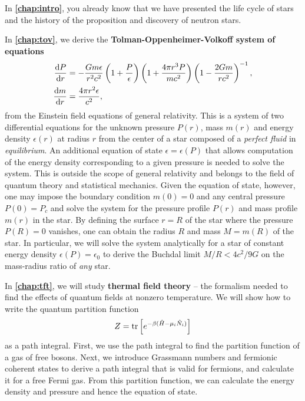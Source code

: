 In \textbf{\cref{chap:intro}}, you already know that we have presented the life cycle of stars and the history of the proposition and discovery of neutron stars.

In \textbf{\cref{chap:tov}}, we derive the \textbf{Tolman-Oppenheimer-Volkoff system of equations}
\begin{align*}
	\odv{P}{r} &= -\frac{G m \epsilon}{r^2 c^2} \left( 1 + \frac{P}{\epsilon} \right) \left( 1 + \frac{4 \pi r^3 P}{m c^2} \right) \left( 1 - \frac{2 G m}{r c^2} \right)^{-1} , \\
	\odv{m}{r} &= \frac{4 \pi r^2 \epsilon}{c^2} ,
\end{align*}
from the Einstein field equations of general relativity.
This is a system of two differential equations for the unknown pressure $P(r)$, mass $m(r)$ and energy density $\epsilon(r)$ at radius $r$ from the center of a star composed of a \emph{perfect fluid} in \emph{equilibrium}.
An additional equation of state $\epsilon = \epsilon(P)$ that allows computation of the energy density corresponding to a given pressure is needed to solve the system.
This is outside the scope of general relativity and belongs to the field of quantum theory and statistical mechanics.
Given the equation of state, however, one may impose the boundary condition $m(0) = 0$ and any central pressure $P(0) = P_c$ and solve the system for the pressure profile $P(r)$ and mass profile $m(r)$ in the star.
By defining the surface $r=R$ of the star where the pressure $P(R) = 0$ vanishes, one can obtain the radius $R$ and mass $M = m(R)$ of the star.
In particular, we will solve the system analytically for a star of constant energy density $\epsilon(P) = \epsilon_0$ to derive the Buchdal limit $M/R < 4 c^2 / 9 G$ on the mass-radius ratio of \emph{any} star.

In \textbf{\cref{chap:tft}}, we will study \textbf{thermal field theory} -- the formalism needed to find the effects of quantum fields at nonzero temperature.
We will show how to write the quantum partition function
\begin{equation*}
	Z = \operatorname{tr} \left[ e^{-\beta(\hat{H} - \mu_i \hat{N}_i)} \right]
\end{equation*}
as a path integral.
First, we use the path integral to find the partition function of a gas of free bosons.
Next, we introduce Grassmann numbers and fermionic coherent states to derive a path integral that is valid for fermions, and calculate it for a free Fermi gas.
From this partition function, we can calculate the energy density and pressure and hence the equation of state.

